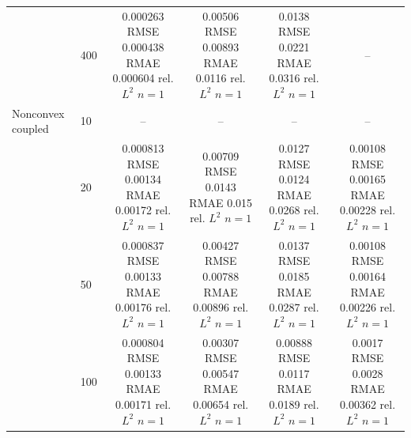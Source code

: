 \begin{tabular}{llcccc}
 & 400 & \shortstack{0.000263 RMSE\\0.000438 RMAE\\0.000604 rel. $L^2$\\$n=1$} & \shortstack{0.00506 RMSE\\0.00893 RMAE\\0.0116 rel. $L^2$\\$n=1$} & \shortstack{0.0138 RMSE\\0.0221 RMAE\\0.0316 rel. $L^2$\\$n=1$} & -- \\
\addlinespace
Nonconvex coupled & 10 & -- & -- & -- & -- \\
 & 20 & \shortstack{0.000813 RMSE\\0.00134 RMAE\\0.00172 rel. $L^2$\\$n=1$} & \shortstack{0.00709 RMSE\\0.0143 RMAE\\0.015 rel. $L^2$\\$n=1$} & \shortstack{0.0127 RMSE\\0.0124 RMAE\\0.0268 rel. $L^2$\\$n=1$} & \shortstack{0.00108 RMSE\\0.00165 RMAE\\0.00228 rel. $L^2$\\$n=1$} \\
 & 50 & \shortstack{0.000837 RMSE\\0.00133 RMAE\\0.00176 rel. $L^2$\\$n=1$} & \shortstack{0.00427 RMSE\\0.00788 RMAE\\0.00896 rel. $L^2$\\$n=1$} & \shortstack{0.0137 RMSE\\0.0185 RMAE\\0.0287 rel. $L^2$\\$n=1$} & \shortstack{0.00108 RMSE\\0.00164 RMAE\\0.00226 rel. $L^2$\\$n=1$} \\
 & 100 & \shortstack{0.000804 RMSE\\0.00133 RMAE\\0.00171 rel. $L^2$\\$n=1$} & \shortstack{0.00307 RMSE\\0.00547 RMAE\\0.00654 rel. $L^2$\\$n=1$} & \shortstack{0.00888 RMSE\\0.0117 RMAE\\0.0189 rel. $L^2$\\$n=1$} & \shortstack{0.0017 RMSE\\0.0028 RMAE\\0.00362 rel. $L^2$\\$n=1$} \\

\end{tabular}
